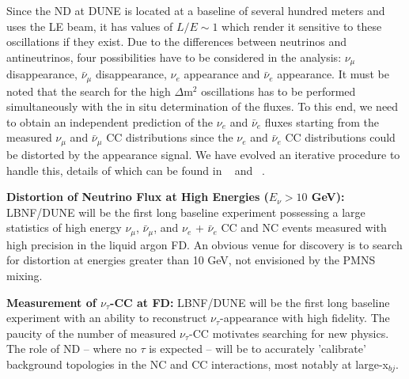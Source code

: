 Since the ND at DUNE  is located at a baseline of several hundred meters  and uses the LE beam, it has values of   $L/E \sim 1$ which render it sensitive to these oscillations if they exist. Due to the differences between neutrinos and antineutrinos,  four possibilities have to be considered in the analysis: $\nu_\mu$ disappearance,  $\bar \nu_\mu$ disappearance, $\nu_e$ appearance and $\bar \nu_e$  appearance. It must be noted that  the search for the high
 $\Delta$m$^2$ oscillations has to be performed simultaneously with the in situ determination of the fluxes. 
To this end, we need to obtain an independent prediction of the $\nu_e$  and $\bar \nu_e$  fluxes starting from the measured $\nu_\mu$ and  $\bar \nu_\mu$ CC distributions since the  $\nu_e$  and $\bar \nu_e$ CC distributions could be distorted by the appearance signal. We have evolved an iterative procedure to handle this, details of which can be found in ~\cite{DPR} and ~\cite{LBNE-SCI}.
 
\vspace{0.25cm} 
\noindent 
{\bf Distortion of Neutrino Flux at High Energies ($E_\nu > 10$ GeV):} 
LBNF/DUNE will be the first long baseline experiment possessing a large 
statistics of high energy $\nu_\mu$,  $\bar \nu_\mu$, and $\nu_e$ + $\bar \nu_e$ CC and NC events 
measured with high precision in the liquid argon FD. An obvious venue for discovery is to 
search for distortion at energies greater than 10 GeV, not envisioned by the 
PMNS mixing. 


\vspace{0.25cm} 
\noindent 
{\bf Measurement of $\nu_\tau$-CC at FD:} 
LBNF/DUNE will be the first long baseline experiment with an ability to 
reconstruct $\nu_\tau$-appearance with high fidelity. The paucity of the number of measured 
$\nu_\tau$-CC motivates searching for new physics. 
The role of ND -- where no $\tau$ is expected -- will be to accurately 'calibrate' background topologies 
in the NC and CC interactions, most notably at large-x$_{bj}$. 


